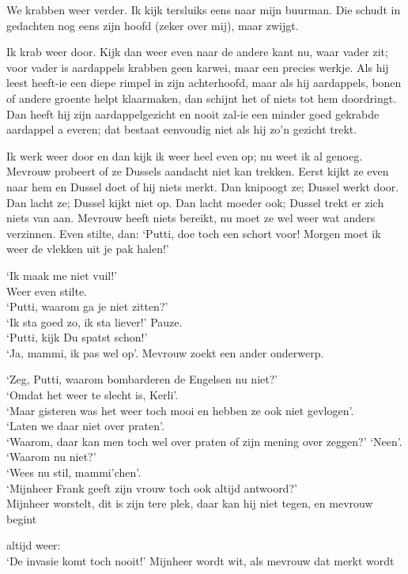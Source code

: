 \documentclass{book}
\begin{document}
We krabben weer verder. Ik kijk tersluiks eens naar mijn buurman. Die
schudt in gedachten nog eens zijn hoofd (zeker over mij), maar zwijgt.

Ik krab weer door. Kijk dan weer even naar de andere kant nu, waar vader
zit; voor vader is aardappels krabben geen karwei, maar een precies
werkje. Als hij leest heeft-ie een diepe rimpel in zijn achterhoofd,
maar als hij aardappels, bonen of andere groente helpt klaarmaken, dan
schijnt het of niets tot hem doordringt. Dan heeft hij zijn
aardappelgezicht en nooit zal-ie een minder goed gekrabde aardappel a
everen; dat bestaat eenvoudig niet als hij zo'n gezicht trekt.

Ik werk weer door en dan kijk ik weer heel even op; nu weet ik al
genoeg. Mevrouw probeert of ze Dussels aandacht niet kan trekken. Eerst
kijkt ze even naar hem en Dussel doet of hij niets merkt. Dan knipoogt
ze; Dussel werkt door. Dan lacht ze; Dussel kijkt niet op. Dan lacht
moeder ook; Dussel trekt er zich niets van aan. Mevrouw heeft niets
bereikt, nu moet ze wel weer wat anders verzinnen. Even stilte, dan:
`Putti, doe toch een schort voor! Morgen moet ik weer de vlekken uit je
pak halen!'

`Ik maak me niet vuil!'\\Weer even stilte.\\`Putti, waarom ga je niet
zitten?'\\`Ik sta goed zo, ik sta liever!' Pauze.\\`Putti, kijk Du
spatst schon!'\\`Ja, mammi, ik pas wel op'. Mevrouw zoekt een ander
onderwerp.

`Zeg, Putti, waarom bombarderen de Engelsen nu niet?'\\`Omdat het weer
te slecht is, Kerli'.\\`Maar gisteren was het weer toch mooi en hebben
ze ook niet gevlogen'.\\`Laten we daar niet over praten'.\\`Waarom, daar
kan men toch wel over praten of zijn mening over zeggen?'
`Neen'.\\`Waarom nu niet?'\\`Wees nu stil, mammi'chen'.\\`Mijnheer Frank
geeft zijn vrouw toch ook altijd antwoord?'\\Mijnheer worstelt, dit is
zijn tere plek, daar kan hij niet tegen, en mevrouw begint

altijd weer:\\`De invasie komt toch nooit!' Mijnheer wordt wit, als
mevrouw dat merkt wordt
\end{document}
